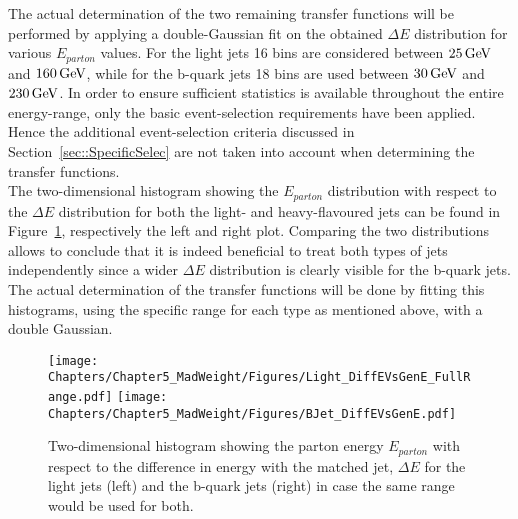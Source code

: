 The actual determination of the two remaining transfer functions will be performed by applying a double-Gaussian fit on the obtained $\Delta E$ distribution for various $E_{parton}$ values.
For the light jets 16 bins are considered between $25 \, \mathrm{GeV}$ and $160 \, \mathrm{GeV}$, while for the b-quark jets 18 bins are used between $30 \, \mathrm{GeV}$ and $230 \, \mathrm{GeV}$.
In order to ensure sufficient statistics is available throughout the entire energy-range, only the basic event-selection requirements have been applied. Hence the additional event-selection criteria discussed in Section~\ref{sec::SpecificSelec} are not taken into account when determining the transfer functions.
\\
The two-dimensional histogram showing the $E_{parton}$ distribution with respect to the $\Delta E$ distribution for both the light- and heavy-flavoured jets can be found in Figure~\ref{fig::TF2DPlot}, respectively the left and right plot.
Comparing the two distributions allows to conclude that it is indeed beneficial to treat both types of jets independently since a wider $\Delta E$ distribution is clearly visible for the b-quark jets.
The actual determination of the transfer functions will be done by fitting this histograms, using the specific range for each type as mentioned above, with a double Gaussian.
\begin{figure}[h!tp]
 \centering
 \texttt{[image: Chapters/Chapter5\_MadWeight/Figures/Light\_DiffEVsGenE\_FullRange.pdf]} \hspace{0.2cm}
 \texttt{[image: Chapters/Chapter5\_MadWeight/Figures/BJet\_DiffEVsGenE.pdf]} 
 \caption{Two-dimensional histogram showing the parton energy $E_{parton}$ with respect to the difference in energy with the matched jet, $\Delta E$ for the light jets (left) and the b-quark jets (right) in case the same range would be used for both.} \label{fig::TF2DPlot}
\end{figure}

